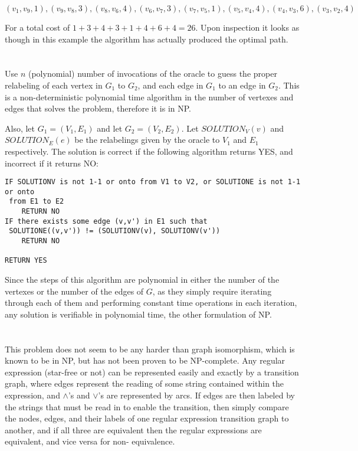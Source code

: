 \documentclass{article}
\begin{document}
\[
(v_1,v_9,1),(v_9,v_8,3),(v_8,v_6,4),(v_6,v_7,3),(v_7,v_5,1),(v_5,v_4,4),
(v_4,v_3,6),(v_3,v_2,4)
\]

For a total cost of $1+3+4+3+1+4+6+4=26$. Upon inspection it looks as though in
this example the algorithm has actually produced the optimal path.

\section{}

\section{}
Use $n$ (polynomial) number of invocations of the oracle to guess the proper
relabeling of each vertex in $G_1$ to $G_2$, and each edge in $G_1$ to an edge
in $G_2$. This is a non-deterministic
polynomial time algorithm in the number of vertexes and edges that solves the
problem, therefore it is in NP.

\vspace{1em}

Also, let $G_1 = (V_1,E_1)$ and let $G_2 = (V_2,E_2)$. Let $SOLUTION_V(v)$ and
$SOLUTION_E(e)$ be the relabelings given by the oracle to $V_1$ and $E_1$
respectively. The solution is correct if the following algorithm returns YES,
and incorrect if it returns NO:

\begin{verbatim}
IF SOLUTIONV is not 1-1 or onto from V1 to V2, or SOLUTIONE is not 1-1 or onto
 from E1 to E2
    RETURN NO
IF there exists some edge (v,v') in E1 such that 
 SOLUTIONE((v,v')) != (SOLUTIONV(v), SOLUTIONV(v'))
    RETURN NO

RETURN YES
\end{verbatim}

Since the steps of this algorithm are polynomial in either the number of
the vertexes or the number of the edges of $G$, as they simply require iterating
through each of them and performing constant time operations in each iteration,
any solution is verifiable in polynomial time, the other formulation of NP.

\section{}
This problem does not seem to be any harder than graph isomorphism, which is
known to be in NP, but has not been proven to be NP-complete. Any
regular expression (star-free or not) can be represented easily and exactly
by a transition graph, where edges represent the reading of some string
contained within the expression, and $\wedge$'s and $\vee$'s are represented by 
arcs. If edges are then labeled by the strings that must be read in to enable
the transition, then simply compare the nodes, edges, and their labels of
one regular expression transition graph to another, and if all three are
equivalent then the regular expressions are equivalent, and vice versa for non-
equivalence.
\end{document}
